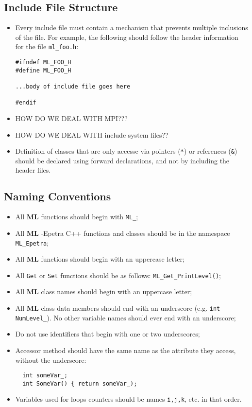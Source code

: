 \documentclass[10pt,letter,relax]{SANDreport}
\newcommand{\ML}     {{\bf ML }}
\begin{document}
\subsection{Include File Structure}

\begin{itemize}
\item Every include file must contain a mechanism that prevents multiple
inclusions of the file. For example, the following should follow the header
information for the file \verb!ml_foo.h!:
\begin{verbatim}
#ifndef ML_FOO_H
#define ML_FOO_H

...body of include file goes here

#endif
\end{verbatim}
\item HOW DO WE DEAL WITH MPI???
\item HOW DO WE DEAL WITH include system files??
\item Definition of classes that are only accesse via pointers (\verb!*!) or
references (\verb!&!) should be declared using forward declarations, and not by
including the header files.
\end{itemize}

\subsection{Naming Conventions}

\begin{itemize}
\item All \ML functions should begin with \verb!ML_!;
\item All \ML-Epetra C++ functions and classes should be in the namespace {\tt
  ML\_Epetra};
\item All \ML functions should begin with an uppercase letter;
\item All \verb!Get! or \verb!Set! functions should be as follows:
\verb!ML_Get_PrintLevel()!;
\item All \ML class names should begin with an uppercase letter;
\item All \ML class data members should end with an underscore (e.g. \verb!int NumLevel_!).
No other variable names should ever end with an underscore;
\item Do not use identifiers that begin with one or two underscores;
\item Accessor method should have the same name as the attribute they access,
  without the underscore:
  \begin{verbatim}
  int someVar_;
  int SomeVar() { return someVar_);
  \end{verbatim}
\item Variables used for loops counters should be names \verb!i,j,k!, etc.
  in that order. 
\end{itemize}
\end{document}
